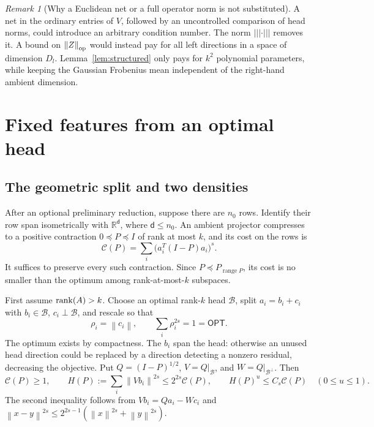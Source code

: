 \documentclass[11pt]{article}
\theoremstyle{remark}\newtheorem{remark}[theorem]{Remark}
\newcommand{\R}{\mathbb R}\newcommand{\E}{\mathbb E}\newcommand{\Prob}{\mathbb P}
\newcommand{\norm}[1]{\left\|#1\right\|}\newcommand{\ip}[2]{\left\langle #1,#2\right\rangle}
\newcommand{\cost}{\mathcal C}\newcommand{\OPT}{\mathsf{OPT}}
\newcommand{\vertiii}[1]{\left|\!\left|\!\left|#1\right|\!\right|\!\right|}
\begin{document}
\begin{remark}[Why a Euclidean net or a full operator norm is not substituted]
A net in the ordinary entries of $V$, followed by an uncontrolled comparison of head norms, could introduce an arbitrary condition number. The norm $\vertiii\cdot$ removes it. A bound on $\norm Z_{\op}$ would instead pay for all left directions in a space of dimension $D_l$. Lemma~\ref{lem:structured} only pays for $k^2$ polynomial parameters, while keeping the Gaussian Frobenius mean independent of the right-hand ambient dimension.
\end{remark}

\section{Fixed features from an optimal head}\label{sec:features}
\subsection{The geometric split and two densities}
After an optional preliminary reduction, suppose there are $n_0$ rows. Identify their row span isometrically with $\R^{\mathsf d}$, where $\mathsf d\le n_0$. An ambient projector compresses to a positive contraction $0\preceq P\preceq I$ of rank at most $k$, and its cost on the rows is
\begin{equation}\label{eq:contraction}
 \cost(P)=\sum_i\bigl(a_i^T(I-P)a_i\bigr)^s.
\end{equation}
It suffices to preserve every such contraction. Since $P\preceq P_{\operatorname{range}P}$, its cost is no smaller than the optimum among rank-at-most-$k$ subspaces.

First assume $\operatorname{rank}(A)>k$. Choose an optimal rank-$k$ head $\mathcal B$, split $a_i=b_i+c_i$ with $b_i\in\mathcal B$, $c_i\perp\mathcal B$, and rescale so that
\[
 \rho_i=\norm{c_i},\qquad \sum_i\rho_i^{2s}=1=\OPT.
\]
The optimum exists by compactness. The $b_i$ span the head: otherwise an unused head direction could be replaced by a direction detecting a nonzero residual, decreasing the objective. Put $Q=(I-P)^{1/2}$, $V=Q|_{\mathcal B}$, and $W=Q|_{\mathcal B^\perp}$. Then
\begin{equation}\label{eq:relative}
 \cost(P)\ge1,\qquad H(P):=\sum_i\norm{Vb_i}^{2s}\le 2^{2s}\cost(P),\qquad
 H(P)^u\le C_s\cost(P)\quad(0\le u\le1).
\end{equation}
The second inequality follows from $Vb_i=Qa_i-Wc_i$ and $\norm{x-y}^{2s}\le2^{2s-1}(\norm x^{2s}+\norm y^{2s})$.
\end{document}
